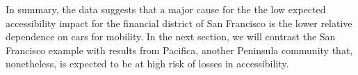 
In summary, the data suggests that a major cause for the the low expected accessibility impact for the financial district of San Francisco is the lower relative dependence on cars for mobility. In the next section, we will contrast the San Francisco example with results from Pacifica, another Peninsula community that, nonetheless, is expected to be at high risk of losses in accessibility.